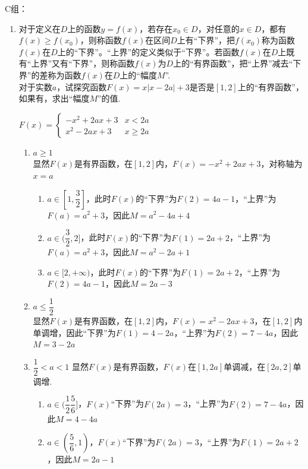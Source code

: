 \begin{enumerate}
\begin{vspace_}
\vsp[5]
\end{vspace_}
 C组：
 \begin{enumerate}
    \item 对于定义在$D$上的函数$y = f(x)$，若存在$x_0 \in D$，对任意的$x \in D$，都有$f(x) \geq f(x_0)$，则称函数$f(x)$在区间$D$上有“下界”，把$f(x_0)$称为函数$f(x)$在$D$上的“下界”。“上界”的定义类似于“下界”。若函数$f(x)$在$D$上既有“上界”又有“下界”，则称函数$f(x)$为$D$上的“有界函数”，把“上界”减去“下界”的差称为函数$f(x)$在$D$上的“幅度$M$”. \\
    对于实数$a$，试探究函数$F(x) = x|x-2a|+3$是否是$[1, 2]$上的“有界函数”，如果有，求出“幅度$M$”的值.
    \begin{jieda}
        $F(x) = \left \{ \begin{array}{ll}
            -x^2 + 2ax + 3 & x < 2a \\
            x^2 - 2ax + 3 & x \geq 2a
        \end{array}\right.$
        \begin{enumerate}
            \item $a \geq 1$ \\
            显然$F(x)$是有界函数，在$[1, 2]$内，$F(x) = -x^2 + 2ax + 3$，对称轴为$x = a$
            \begin{enumerate}[1.]
                \item $a \in [1, \dfrac{3}{2}]$，此时$F(x)$的“下界”为$F(2) = 4a-1$，“上界”为$F(a) = a^2+3$，因此$M = a^2 - 4a  + 4$
                \item $a \in (\dfrac{3}{2}, 2]$，此时$F(x)$的“下界”为$F(1) = 2a+2$，“上界”为$F(a) = a^2+3$，因此$M = a^2 - 2a + 1$
                \item $a \in [2, +\infty)$，此时$F(x)$的“下界”为$F(1) = 2a+2$，“上界”为$F(2) = 4a-1$，因此$M = 2a-3$
            \end{enumerate}
            \item $a \leq \dfrac{1}{2}$ \\
            显然$F(x)$是有界函数，在$[1, 2]$内，$F(x) = x^2 - 2ax + 3$，在$[1,2]$内单调增，因此“下界”为$F(1) = 4-2a$，“上界”为$F(2) = 7-4a$，因此$M = 3-2a$
            \item $\dfrac{1}{2} < a < 1$
            显然$F(x)$是有界函数，$F(x)$在$[1, 2a]$单调减，在$[2a, 2]$单调增.
            \begin{enumerate}[1.]
                \item $a \in (\dfrac{1}{2} \dfrac{5}{6}]$，$F(x)$“下界”为$F(2a) = 3$，“上界”为$F(2) = 7-4a$，因此$M = 4-4a$
                \item $a \in (\dfrac{5}{6}, 1)$，$F(x)$“下界”为$F(2a) = 3$，“上界”为$F(1) = 2a+2$，因此$M = 2a-1$
            \end{enumerate}
        \end{enumerate}
    \end{jieda}
    \begin{vspace_}
    \vsp[5]
    \end{vspace_}
 \end{enumerate}


\end{enumerate}


